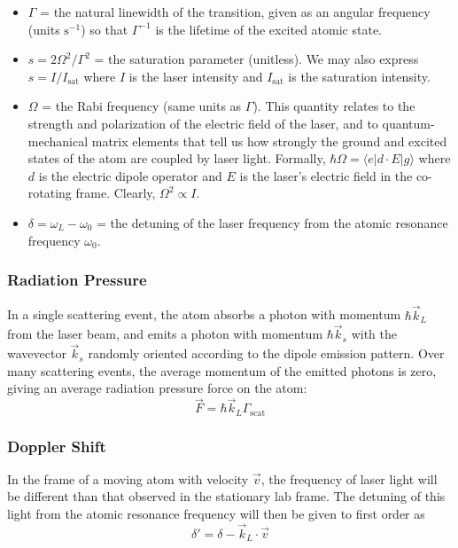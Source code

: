 \documentclass{../lab}
\begin{document}
\begin{itemize}
    \item $\Gamma$ = the natural linewidth of the transition, given as an angular frequency (units $\mbox{s}^{-1}$) so that $\Gamma^{-1}$ is the lifetime of the excited atomic state.

    \item $s = 2\Omega^2/\Gamma^2$ = the saturation parameter (unitless). We may also express $s = I/I_\text{sat}$ where $I$ is the laser intensity and $I_\text{sat}$ is the saturation intensity.

    \item $\Omega$ = the Rabi frequency (same units as $\Gamma$). This quantity relates to the strength and polarization of the electric field of the laser, and to quantum-mechanical matrix elements that tell us how strongly the ground and excited states of the atom are coupled by laser light. Formally, $\hbar\Omega =  \langle e|d\cdot E|g\rangle$ where $d$ is the electric dipole operator and $ E$ is the laser's electric field in the co-rotating frame. Clearly, $\Omega^2 \propto  I$.

    \item $\delta = \omega_L - \omega_0$ = the detuning of the laser frequency from the atomic resonance frequency $\omega_0$.
\end{itemize}

\subsubsection{Radiation Pressure}

In a single scattering event, the atom absorbs a photon with momentum $\hbar\vec{k}_L$ from the laser beam, and emits a photon with momentum $\hbar\vec{k}_s$ with the wavevector $\vec{k}_s$ randomly oriented according to the dipole emission pattern. Over many scattering events, the average momentum of the emitted photons is zero, giving an average radiation pressure force on the atom:
\begin{equation}
    \vec{F} = \hbar \vec{k}_L \Gamma_\text{scat}
\end{equation}

\subsubsection{Doppler Shift}
\label{sec:dopplershift}

In the frame of a moving atom with velocity $\vec{v}$, the frequency of laser light will be different than that observed in the stationary lab frame. The detuning of this light from the atomic resonance frequency will then be given to first order as
\begin{equation}
    \delta' = \delta - \vec{k}_L\cdot \vec{v}
\end{equation}
\end{document}
